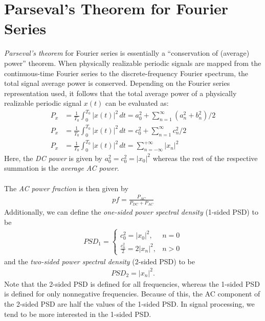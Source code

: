 \documentclass{report}
\begin{document}
\section{Parseval's Theorem for Fourier Series}
\emph{Parseval's theorem} for Fourier series is essentially a ``conservation of (average) power'' theorem. When physically realizable periodic signals are mapped from the continuous-time Fourier series to the discrete-frequency Fourier spectrum, the total 
signal average power is conserved. Depending on the Fourier series representation used, it follows that the total average power of a physically realizable periodic signal $x(t)$ can be evaluated as:
\begin{align}
    P_x &= \frac{1}{T_0}\int_{0}^{T_0} |x(t)|^2 \,dt = a_0^2 +\sum_{n=1}^{\infty}(a_n^2 + b_n^2)/2 \\
    P_x &= \frac{1}{T_0}\int_{0}^{T_0} |x(t)|^2 \,dt = c_0^2 +\sum_{n=1}^{\infty}c_n^2/2 \\
    P_x &= \frac{1}{T_0}\int_{0}^{T_0} |x(t)|^2 \,dt = \sum_{n=-\infty}^{+\infty}|x_n|^2
\end{align}
Here, the \emph{DC power} is given by $a_0^2 = c_0^2 = |x_0|^2$ whereas the rest of the respective summation is the \emph{average AC power}. 
\\ \\
The \emph{AC power fraction} is then given by 
\begin{align}
    pf=\frac{P_{AC}}{P_{DC} + P_{AC}}
\end{align}
Additionally, we can define the \emph{one-sided power spectral density} (1-sided PSD) to be 
\begin{align}
    PSD_1 = 
    \begin{cases}
        c_0^2 = |x_0|^2, & n=0 \\
        \frac{c_n^2}{2} = 2|x_n|^2, & n>0
    \end{cases}
\end{align}
and the \emph{two-sided power spectral density} (2-sided PSD) to be 
\begin{align}
    PSD_2 = |x_n|^2.
\end{align}
Note that the 2-sided PSD is defined for all frequencies, whereas the 1-sided PSD is defined for only nonnegative frequencies. 
Because of this, the AC component of the 2-sided PSD are half the values of the 1-sided PSD. In signal processing, we tend to be more interested in the 1-sided PSD.
\end{document}
